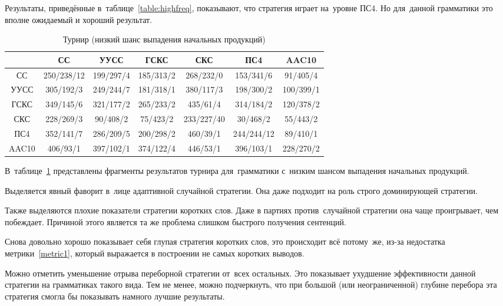 \documentclass{csmathnotes}
\begin{document}
Результаты, приведённые в~таблице~\ref{table:highfreq}, показывают, что стратегия играет на~уровне ПС4. Но для~данной грамматики это вполне ожидаемый и хороший результат.

\begin{table}[!h]
	\small
	\setlength\tabcolsep{1.6pt}
	\centering
	\caption{Турнир (низкий шанс выпадения начальных продукций)}
	\label{table:lowfreq}
	\begin{tabular}{| c | c | c | c | c | c | c |}
		\hline
		      & СС         & УУСС      & ГСКС      & СКС        & ПС4        & AAC10     \\ \hline
		СС    & 250/238/12 & 199/297/4 & 185/313/2 & 268/232/0  & 153/341/6  & 91/405/4  \\ \hline
		УУСС  & 305/192/3  & 249/244/7 & 181/318/1 & 380/117/3  & 198/300/2  & 100/399/1 \\ \hline
		ГСКС  & 349/145/6  & 321/177/2 & 265/233/2 & 435/61/4   & 314/184/2  & 120/378/2 \\ \hline
		СКС   & 228/269/3  & 90/408/2  & 75/423/2  & 233/227/40 & 30/468/2   & 55/443/2  \\ \hline
		ПС4   & 352/141/7  & 286/209/5 & 200/298/2 & 460/39/1   & 244/244/12 & 89/410/1  \\ \hline
		AAC10 & 406/93/1   & 397/102/1 & 374/122/4 & 446/53/1   & 396/103/1  & 228/270/2 \\ \hline
	\end{tabular}
\end{table}
\sloppy
{
}
В~таблице~\ref{table:lowfreq} представлены фрагменты результатов турнира для~грамматики с~низким шансом выпадения начальных продукций. 

Выделяется явный фаворит в~лице адаптивной случайной стратегии. Она даже подходит на роль строго доминирующей стратегии.

Также выделяются плохие показатели стратегии коротких слов. Даже в партиях против~случайной стратегии она чаще проигрывает, чем побеждает. Причиной этого является та же проблема слишком быстрого получения сентенций. 

Снова довольно хорошо показывает себя глупая стратегия коротких слов, это происходит всё потому~же, из-за недостатка метрики~\ref{metric1}, который выражается в построении не самых коротких выводов. 

Можно отметить уменьшение отрыва переборной стратегии от~всех остальных. Это показывает ухудшение эффективности данной стратегии на грамматиках такого вида. Тем не менее, можно подчеркнуть, что при большой (или неограниченной) глубине перебора эта стратегия смогла бы показывать намного лучшие результаты.
\end{document}

